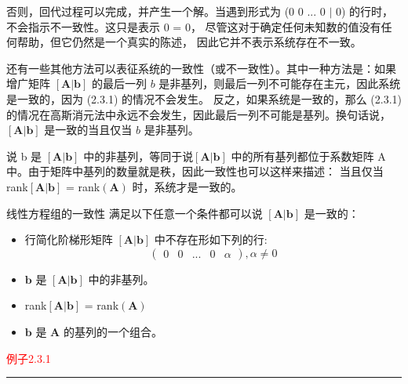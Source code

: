 否则，回代过程可以完成，并产生一个解。当遇到形式为
(0 0 ... 0 \(\mid\) 0) 的行时，不会指示不一致性。这只是表示 0 = 0，
尽管这对于确定任何未知数的值没有任何帮助，但它仍然是一个真实的陈述，
因此它并不表示系统存在不一致。

还有一些其他方法可以表征系统的一致性（或不一致性）。其中一种方法是：如果增广矩阵 \([\mathbf{A}|\mathbf{b}]\) 的最后一列 \(b\) 是非基列，则最后一列不可能存在主元，因此系统是一致的，因为 (2.3.1) 的情况不会发生。
反之，如果系统是一致的，那么 (2.3.1) 的情况在高斯消元法中永远不会发生，因此最后一列不可能是基列。换句话说，\([\mathbf{A}|\mathbf{b}]\) 是一致的当且仅当 \(b\) 是非基列。

说 b 是 \([\mathbf{A}|\mathbf{b}]\) 中的非基列，等同于说\([\mathbf{A}|\mathbf{b}]\) 中的所有基列都位于系数矩阵 A 中。由于矩阵中基列的数量就是秩，因此一致性也可以这样来描述：
当且仅当 rank\([\mathbf{A}|\mathbf{b}]\) = rank\((\mathbf{A})\) 时，系统才是一致的。

\begin{bluebox}{线性方程组的一致性}
满足以下任意一个条件都可以说 \([\mathbf{A}|\mathbf{b}]\) 是一致的：
\begin{itemize}
    \item 行简化阶梯形矩阵 \([\mathbf{A}|\mathbf{b}]\) 中不存在形如下列的行:
    \[
    \left(\begin{array}{cccc|c}
        0 & 0 & ... & 0 & \alpha
    \end{array}\right), \alpha \neq 0
    \]
    \item \(\mathbf{b}\) 是 \([\mathbf{A}|\mathbf{b}]\) 中的非基列。
    \item rank\([\mathbf{A}|\mathbf{b}]\) = rank\((\mathbf{A})\)
    \item \(\mathbf{b}\) 是 \(\mathbf{A}\) 的基列的一个组合。
\end{itemize}
\end{bluebox}

\textcolor{red}{例子2.3.1}
\color{red}\rule{\textwidth}{0.4pt}\color{black}

